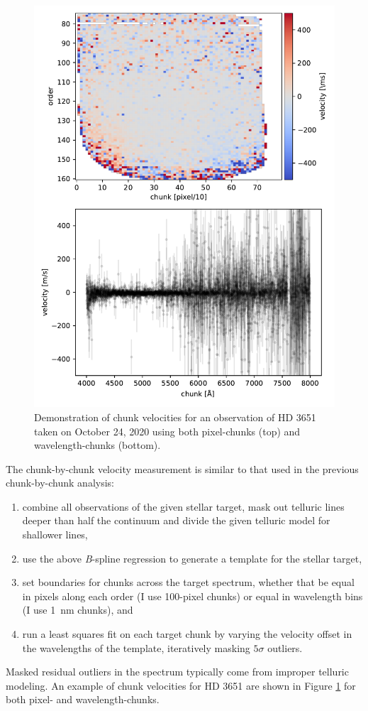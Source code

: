 \begin{figure}
    \centering
    \includegraphics{figures-5/chunk-vels.pdf}
    \caption{Demonstration of chunk velocities for an observation of HD 3651 taken on October 24, 2020 using both pixel-chunks (top) and wavelength-chunks (bottom).}
    \label{fig:chunk-vels}
\end{figure}

The chunk-by-chunk velocity measurement is similar to that used in the previous chunk-by-chunk analysis:
\begin{enumerate}
    \item combine all observations of the given stellar target, mask out telluric lines deeper than half the continuum and divide the given telluric model for shallower lines,
    \item use the above \textit{B}-spline regression to generate a template for the stellar target,
    \item set boundaries for chunks across the target spectrum, whether that be equal in pixels along each order (I use 100-pixel chunks) or equal in wavelength bins (I use 1~nm chunks), and
    \item run a least squares fit on each target chunk by varying the velocity offset in the wavelengths of the template, iteratively masking $5\sigma$ outliers.
\end{enumerate}
Masked residual outliers in the spectrum typically come from improper telluric modeling. An example of chunk velocities for HD 3651 are shown in Figure \ref{fig:chunk-vels} for both pixel- and wavelength-chunks.

